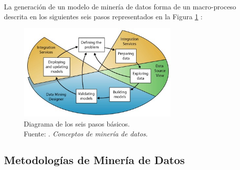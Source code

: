 La generación de un modelo de minería de datos forma de un macro-proceso descrita en los siguientes seis pasos representados en la Figura \ref{2:fig8} \parencite{gl_microsoft2019datamining}:
\begin{figure}[h]
	\begin{center}
		\includegraphics[width=0.7\textwidth]{2/figures/data_mining_steps.jpg}
		\caption[Diagrama de los seis pasos básicos]{Diagrama de los seis pasos básicos.\\
		Fuente: \cite{gl_microsoft2019datamining}. \textit{Conceptos de minería de datos}.}
		\label{2:fig8}
	\end{center}
\end{figure}

\clearpage

\subsection{Metodologías de Minería de Datos}

